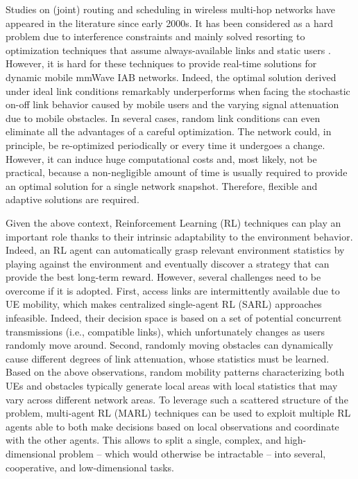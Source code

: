 Studies on (joint) routing and scheduling in wireless multi-hop networks have appeared in the literature since early 2000s. It has been considered as a hard problem due to interference constraints and mainly solved resorting to optimization techniques that assume always-available links and static users \cite{yuan2018optimal}.
However, it is hard for these techniques to provide real-time solutions for dynamic mobile mmWave IAB networks.
Indeed, the optimal solution derived under ideal link conditions remarkably underperforms when facing the stochastic on-off link behavior caused by mobile users and the varying signal attenuation due to mobile obstacles.
In several cases, random link conditions can even eliminate all the advantages of a careful optimization.
The network could, in principle, be re-optimized periodically or every time it undergoes a change. However, it can induce huge computational costs and, most likely, not be practical, because a non-negligible amount of time is usually required to provide an optimal solution for a single network snapshot.
Therefore, flexible and adaptive solutions are required.

Given the above context, Reinforcement Learning (RL) techniques can play an important role thanks to their intrinsic adaptability to the environment behavior.
Indeed, an RL agent can automatically grasp relevant environment statistics by playing against the environment and eventually discover a strategy that can provide the best long-term reward.
However, several challenges need to be overcome if it is adopted.
First, access links are intermittently available due to UE mobility, which makes centralized single-agent RL (SARL) approaches infeasible. Indeed, their decision space is based on a set of potential concurrent transmissions (i.e., compatible links), which unfortunately changes as users randomly move around.
Second, randomly moving obstacles can dynamically cause different degrees of link attenuation, whose statistics must be learned.
Based on the above observations, random mobility patterns characterizing both UEs and obstacles typically generate local areas with local statistics that may vary across different network areas. To leverage such a scattered structure of the problem, multi-agent RL (MARL) techniques can be used to exploit multiple RL agents able to both make decisions based on local observations and coordinate with the other agents. This allows to split a single, complex, and high-dimensional problem -- which would otherwise be intractable -- into several, cooperative, and low-dimensional tasks.

